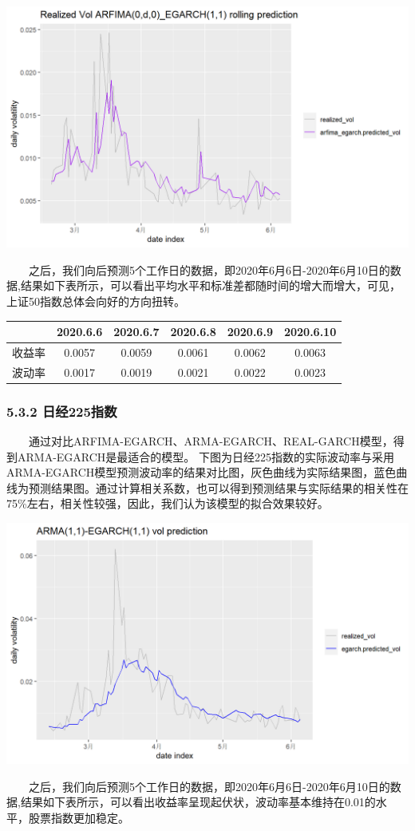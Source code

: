 \documentclass[
  11pt,
  letterpaper,
]{article}
\begin{document}
\includegraphics[width=0.7\linewidth]{./15}

  之后，我们向后预测5个工作日的数据，即2020年6月6日-2020年6月10日的数据,结果如下表所示，可以看出平均水平和标准差都随时间的增大而增大，可见，上证50指数总体会向好的方向扭转。

\begin{longtable}[]{@{}cccccc@{}}
\toprule
& 2020.6.6 & 2020.6.7 & 2020.6.8 & 2020.6.9 & 2020.6.10\tabularnewline
\midrule
\endhead
收益率 & 0.0057 & 0.0059 & 0.0061 & 0.0062 & 0.0063\tabularnewline
波动率 & 0.0017 & 0.0019 & 0.0021 & 0.0022 & 0.0023\tabularnewline
\bottomrule
\end{longtable}

\hypertarget{ux65e5ux7ecf225ux6307ux6570}{%
\subsubsection{5.3.2 日经225指数}\label{ux65e5ux7ecf225ux6307ux6570}}

  通过对比ARFIMA-EGARCH、ARMA-EGARCH、REAL-GARCH模型，得到ARMA-EGARCH是最适合的模型。
下图为日经225指数的实际波动率与采用ARMA-EGARCH模型预测波动率的结果对比图，灰色曲线为实际结果图，蓝色曲线为预测结果图。通过计算相关系数，也可以得到预测结果与实际结果的相关性在75\%左右，相关性较强，因此，我们认为该模型的拟合效果较好。

\includegraphics[width=0.7\linewidth]{./16}

  之后，我们向后预测5个工作日的数据，即2020年6月6日-2020年6月10日的数据,结果如下表所示，可以看出收益率呈现起伏状，波动率基本维持在0.01的水平，股票指数更加稳定。
\end{document}
